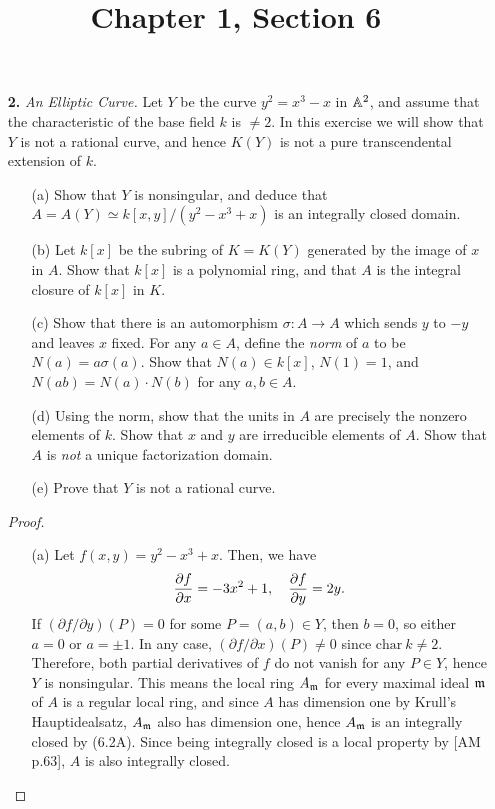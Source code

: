 \documentclass{article}
\title{Chapter 1, Section 6}
\begin{document}
\maketitle
\begin{enumerate} [label=\textbf{\arabic*.}, leftmargin=0cm]


\item[\textbf{2.}] \textit{An Elliptic Curve.} Let $Y$ be the curve $y^2 = x^3 - x$ in $\mathbb{A}^2$, and assume that the characteristic of the base field $k$ is $\neq 2$. In this exercise we will show that $Y$ is not a rational curve, and hence $K(Y)$ is not a pure transcendental extension of $k$.
\begin{itemize}
    \item[(a)] Show that $Y$ is nonsingular, and deduce that $A = A(Y) \simeq k[x, y] / (y^2 - x^3 + x)$ is an integrally closed domain.
    \item[(b)] Let $k[x]$ be the subring of $K = K(Y)$ generated by the image of $x$ in $A$. Show that $k[x]$ is a polynomial ring, and that $A$ is the integral closure of $k[x]$ in $K$.
    \item[(c)] Show that there is an automorphism $\sigma : A \to A$ which sends $y$ to $-y$ and leaves $x$ fixed. For any $a \in A$, define the \textit{norm} of $a$ to be $N(a) = a \sigma(a)$. Show that $N(a) \in k[x]$, $N(1) = 1$, and $N(ab) = N(a) \cdot N(b)$ for any $a, b \in A$.
    \item[(d)] Using the norm, show that the units in $A$ are precisely the nonzero elements of $k$. Show that $x$ and $y$ are irreducible elements of $A$. Show that $A$ is \textit{not} a unique factorization domain.
    \item[(e)] Prove that $Y$ is not a rational curve. 
\end{itemize}

\begin{proof} $ $ \vspace{0pt}
  \begin{itemize} [leftmargin=0cm]
    \item[(a)] Let $f(x, y) = y^2 - x^3 + x$. Then, we have
    \begin{equation*}
      \pdv{f}{x} = -3x^2 + 1, \quad \pdv{f}{y} = 2y.
    \end{equation*}
    If $(\partial f / \partial y)(P) = 0$ for some $P = (a, b) \in Y$, then $b = 0$, so either $a = 0$ or $a = \pm 1$. In any case, $(\partial f / \partial x)(P) \neq 0$ since $\text{char}~k \neq 2$. Therefore, both partial derivatives of $f$ do not vanish for any $P \in Y$, hence $Y$ is nonsingular. This means the local ring $A_{\mathfrak{m}}$ for every maximal ideal $\mathfrak{m}$ of $A$ is a regular local ring, and since $A$ has dimension one by Krull's Hauptidealsatz, $A_{\mathfrak{m}}$ also has dimension one, hence $A_{\mathfrak{m}}$ is an integrally closed by (6.2A). Since being integrally closed is a local property by [AM p.63], $A$ is also integrally closed.


\end{itemize}
\end{proof}
\end{enumerate}
\end{document}
